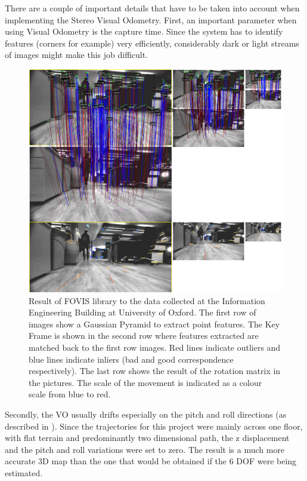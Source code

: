\documentclass[11pt]{article}
\begin{document}
There are a couple of important details that have to be taken into account when implementing the Stereo Visual Odometry. First, an important parameter when using Visual Odometry is the capture time. Since the system has to identify features (corners for example) very efficiently, considerably dark or light streams of images might make this job difficult.  
	
	\begin{figure}
		\begin{minipage}{0.65\textwidth}
			\centering
			\includegraphics[width=\textwidth]{VisualOdometry1}
		\end{minipage} \hfill
		\begin{minipage}{0.35\textwidth}
			\centering
			\caption[t]{Result of FOVIS library to the data collected at the Information Engineering Building at University of Oxford. The first row of images show a Gaussian Pyramid to extract point features. The Key Frame is shown in the second row where features extracted are matched back to the first row images. Red lines indicate outliers and blue lines indicate inliers (bad and good correspondence respectively). The last row shows the result of the rotation matrix in the pictures. The scale of the movement is indicated as a colour scale from blue to red.}
			\label{fig:VisualOdometry1}	
		\end{minipage}				
	\end{figure}

Secondly, the VO usually drifts especially on the pitch and roll directions (as described in \cite{usenko2016direct}). Since the trajectories for this project were mainly across one floor, with flat terrain and predominantly two dimensional path, the z displacement and the pitch and roll variations were set to zero. The result is a much more accurate 3D map than the one that would be obtained if the 6 DOF were being estimated.
	
\end{document}
